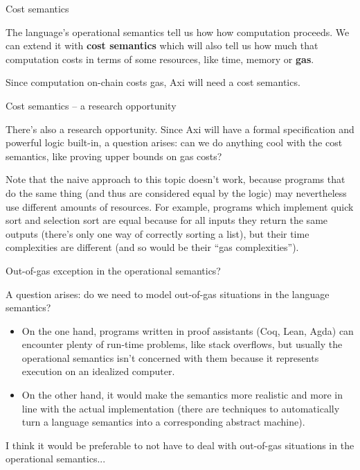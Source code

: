 \documentclass{beamer}
\begin{document}
\begin{frame}{Cost semantics}

The language's operational semantics tell us how how computation proceeds. We can extend it with \textbf{cost semantics} which will also tell us how much that computation costs in terms of some resources, like time, memory or \textbf{gas}.

\vspace{2em}

Since computation on-chain costs gas, Axi will need a cost semantics.

\end{frame}

\begin{frame}{Cost semantics -- a research opportunity}

There's also a research opportunity. Since Axi will have a formal specification and powerful logic built-in, a question arises: can we do anything cool with the cost semantics, like proving upper bounds on gas costs?

\vspace{2em}

Note that the naive approach to this topic doesn't work, because programs that do the same thing (and thus are considered equal by the logic) may nevertheless use different amounts of resources. For example, programs which implement quick sort and selection sort are equal because for all inputs they return the same outputs (there's only one way of correctly sorting a list), but their time complexities are different (and so would be their ``gas complexities'').

\end{frame}

\begin{frame}{Out-of-gas exception in the operational semantics?}

A question arises: do we need to model out-of-gas situations in the language semantics?

\begin{itemize}
  \item On the one hand, programs written in proof assistants (Coq, Lean, Agda) can encounter plenty of run-time problems, like stack overflows, but usually the operational semantics isn't concerned with them because it represents execution on an idealized computer.
  \item On the other hand, it would make the semantics more realistic and more in line with the actual implementation (there are techniques to automatically turn a language semantics into a corresponding abstract machine).
\end{itemize}

\vspace{2em}

I think it would be preferable to not have to deal with out-of-gas situations in the operational semantics...

\end{frame}
\end{document}
